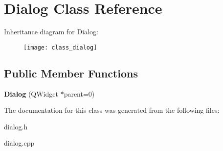 \hypertarget{class_dialog}{\section{Dialog Class Reference}
\label{class_dialog}
}
Inheritance diagram for Dialog\-:\begin{figure}[H]
\begin{center}
\leavevmode
\texttt{[image: class\_dialog]}
\end{center}
\end{figure}
\subsection*{Public Member Functions}
\begin{DoxyCompactItemize}
\item 
\hypertarget{class_dialog_acfa2063f9f962d394c6a645b6e7e08d8}{{\bfseries Dialog} (Q\-Widget $\ast$parent=0)}\label{class_dialog_acfa2063f9f962d394c6a645b6e7e08d8}

\end{DoxyCompactItemize}


The documentation for this class was generated from the following files\-:\begin{DoxyCompactItemize}
\item 
dialog.\-h\item 
dialog.\-cpp\end{DoxyCompactItemize}

